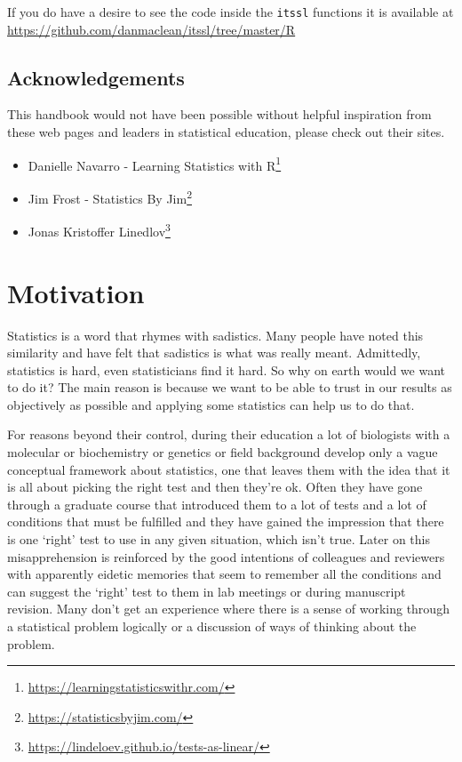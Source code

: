 \documentclass[
]{book}
\providecommand{\tightlist}{%
  \setlength{\itemsep}{0pt}\setlength{\parskip}{0pt}}
\renewcommand{\href}[2]{#2\footnote{\url{#1}}}
\begin{document}
If you do have a desire to see the code inside the \texttt{itssl} functions it is available at \url{https://github.com/danmaclean/itssl/tree/master/R}

\hypertarget{acknowledgements}{%
\section{Acknowledgements}\label{acknowledgements}}

This handbook would not have been possible without helpful inspiration from these web pages and leaders in statistical education, please check out their sites.

\begin{itemize}
\tightlist
\item
  \href{https://learningstatisticswithr.com/}{Danielle Navarro - Learning Statistics with R}
\item
  \href{https://statisticsbyjim.com/}{Jim Frost - Statistics By Jim}
\item
  \href{https://lindeloev.github.io/tests-as-linear/}{Jonas Kristoffer Linedlov}
\end{itemize}

\hypertarget{motivation}{%
\chapter{Motivation}\label{motivation}}

Statistics is a word that rhymes with sadistics. Many people have noted this similarity and have felt that sadistics is what was really meant. Admittedly, statistics is hard, even statisticians find it hard. So why on earth would we want to do it? The main reason is because we want to be able to trust in our results as objectively as possible and applying some statistics can help us to do that.

For reasons beyond their control, during their education a lot of biologists with a molecular or biochemistry or genetics or field background develop only a vague conceptual framework about statistics, one that leaves them with the idea that it is all about picking the right test and then they're ok. Often they have gone through a graduate course that introduced them to a lot of tests and a lot of conditions that must be fulfilled and they have gained the impression that there is one `right' test to use in any given situation, which isn't true. Later on this misapprehension is reinforced by the good intentions of colleagues and reviewers with apparently eidetic memories that seem to remember all the conditions and can suggest the `right' test to them in lab meetings or during manuscript revision. Many don't get an experience where there is a sense of working through a statistical problem logically or a discussion of ways of thinking about the problem.
\end{document}

